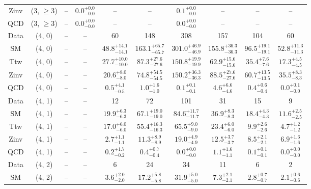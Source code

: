 \begin{table}[h!]
{\begin{tabular}{cccccccccc}
	Zinv & (3, $\ge3$) & -- & $0.0^{+ 0.0 }_{- 0.0 }$ & -- & -- & $0.1^{+ 0.0 }_{- 0.0 }$ & -- & -- & -- \\[0.5ex] 
	QCD & (3, $\ge3$) & -- & $0.0^{+ 0.0 }_{- 0.0 }$ & -- & -- & $0.0^{+ 0.0 }_{- 0.0 }$ & -- & -- & -- \\[0.5ex] 
	Data & (4, 0) & -- & -- & 60 & 148 & 308 & 157 & 104 & 60 \\[0.5ex] 
	SM & (4, 0) & -- & -- & $48.8^{+ 14.1 }_{- 14.1 }$ & $163.1^{+ 65.7 }_{- 65.7 }$ & $301.0^{+ 46.9 }_{- 46.9 }$ & $155.8^{+ 36.3 }_{- 36.3 }$ & $96.5^{+ 19.1 }_{- 19.1 }$ & $52.8^{+ 11.3 }_{- 11.3 }$ \\[0.5ex] 
	Ttw & (4, 0) & -- & -- & $27.7^{+ 10.0 }_{- 10.0 }$ & $87.3^{+ 27.6 }_{- 27.6 }$ & $150.8^{+ 19.9 }_{- 19.9 }$ & $62.9^{+ 15.6 }_{- 15.6 }$ & $35.4^{+ 7.6 }_{- 7.6 }$ & $17.3^{+ 4.5 }_{- 4.5 }$ \\[0.5ex] 
	Zinv & (4, 0) & -- & -- & $20.6^{+ 8.0 }_{- 8.0 }$ & $74.8^{+ 54.5 }_{- 54.5 }$ & $150.2^{+ 36.3 }_{- 36.3 }$ & $88.5^{+ 27.6 }_{- 27.6 }$ & $60.7^{+ 13.5 }_{- 13.5 }$ & $35.5^{+ 8.3 }_{- 8.3 }$ \\[0.5ex] 
	QCD & (4, 0) & -- & -- & $0.5^{+ 4.1 }_{- 0.5 }$ & $1.0^{+ 1.6 }_{- 1.0 }$ & $0.1^{+ 0.1 }_{- 0.1 }$ & $4.6^{+ 6.6 }_{- 4.6 }$ & $0.4^{+ 0.6 }_{- 0.4 }$ & $0.0^{+ 0.1 }_{- 0.0 }$ \\[0.5ex] 
	Data & (4, 1) & -- & -- & 12 & 72 & 101 & 31 & 15 & 9 \\[0.5ex] 
	SM & (4, 1) & -- & -- & $19.9^{+ 6.3 }_{- 6.3 }$ & $67.1^{+ 19.0 }_{- 19.0 }$ & $84.6^{+ 11.7 }_{- 11.7 }$ & $36.9^{+ 8.3 }_{- 8.3 }$ & $18.4^{+ 4.3 }_{- 4.3 }$ & $11.6^{+ 2.5 }_{- 2.5 }$ \\[0.5ex] 
	Ttw & (4, 1) & -- & -- & $17.0^{+ 6.0 }_{- 6.0 }$ & $55.4^{+ 16.3 }_{- 16.3 }$ & $65.5^{+ 9.0 }_{- 9.0 }$ & $23.4^{+ 6.0 }_{- 6.0 }$ & $9.9^{+ 2.6 }_{- 2.6 }$ & $4.7^{+ 1.2 }_{- 1.2 }$ \\[0.5ex] 
	Zinv & (4, 1) & -- & -- & $2.7^{+ 1.1 }_{- 1.1 }$ & $11.3^{+ 8.9 }_{- 8.9 }$ & $19.0^{+ 4.9 }_{- 4.9 }$ & $12.5^{+ 3.7 }_{- 3.7 }$ & $8.5^{+ 2.1 }_{- 2.1 }$ & $6.9^{+ 1.6 }_{- 1.6 }$ \\[0.5ex] 
	QCD & (4, 1) & -- & -- & $0.2^{+ 1.7 }_{- 0.2 }$ & $0.4^{+ 0.7 }_{- 0.4 }$ & $0.0^{+ 0.0 }_{- 0.0 }$ & $1.1^{+ 1.6 }_{- 1.1 }$ & $0.1^{+ 0.1 }_{- 0.1 }$ & $0.0^{+ 0.0 }_{- 0.0 }$ \\[0.5ex] 
	Data & (4, 2) & -- & -- & 6 & 24 & 34 & 11 & 6 & 2 \\[0.5ex] 
	SM & (4, 2) & -- & -- & $3.6^{+ 2.0 }_{- 2.0 }$ & $17.2^{+ 5.8 }_{- 5.8 }$ & $31.9^{+ 5.0 }_{- 5.0 }$ & $7.3^{+ 2.1 }_{- 2.1 }$ & $2.8^{+ 0.7 }_{- 0.7 }$ & $2.1^{+ 0.6 }_{- 0.6 }$ \\[0.5ex] 

\end{tabular}}
\end{table}
